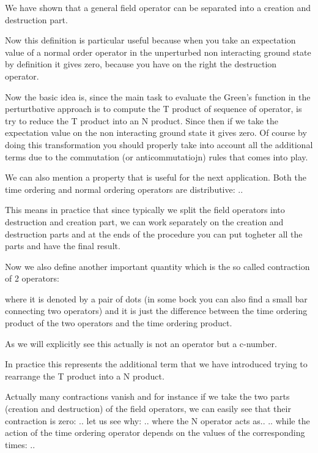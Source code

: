 \documentclass[../main/main.tex]{subfiles}
\begin{document}

We have shown that a general field operator can be separated into a creation and destruction part.

Now this definition is particular useful because when you take an expectation value of a normal order operator in the unperturbed non interacting ground state by definition it gives zero, because you have on the right the destruction operator.


Now the basic idea is, since the main task to evaluate the Green's function in the perturtbative approach is to compute the T product of sequence of operator, is try to reduce the T product into an N product. Since then if we take the expectation value on the non interacting ground state it gives zero. Of course by doing this transformation you should properly take into account all the additional terms due to the commutation (or anticommutatiojn) rules that comes into play.


We can also mention a property that is useful for the next application. Both the time ordering and normal ordering operators are distributive:
..

This means in practice that since typically we split the field operators into destruction and creation part, we can work separately on the creation and destruction parts and at the ends of the procedure you can put togheter all the parts and have the final result.

Now we also define another important quantity which is the so called contraction of 2 operators:


where it is denoted by a pair of dots (in some bock you can also find a small bar connecting two operators) and it is just the difference between the time ordering product of the two operators and the time ordering product.

As we will explicitly see this actually is not an operator but a c-number.


In practice this represents the additional term that we have introduced trying to rearrange the T product into a N product.

Actually many contractions vanish and for instance if we take the two parts (creation and destruction) of the field operators, we can easily see that their contraction is zero:
..
let us see why:
..
where the N operator acts as..
..
while the action of the time ordering operator depends on the values of the corresponding times:
..
\end{document}

